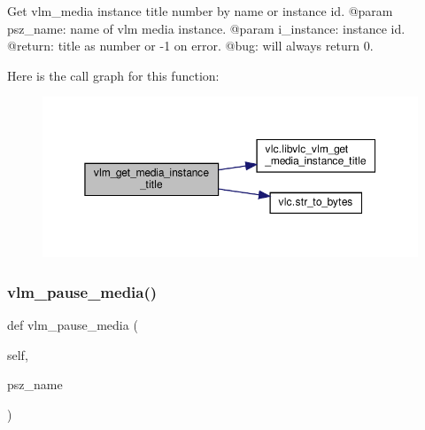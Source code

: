 \begin{DoxyVerb}Get vlm_media instance title number by name or instance id.
@param psz_name: name of vlm media instance.
@param i_instance: instance id.
@return: title as number or -1 on error.
@bug: will always return 0.
\end{DoxyVerb}
 Here is the call graph for this function\+:
\nopagebreak
\begin{figure}[H]
\begin{center}
\leavevmode
\includegraphics[width=350pt]{classvlc_1_1_instance_ada993533f9c1e0ac7b29e902ed26573a_cgraph}
\end{center}
\end{figure}
\mbox{\label{classvlc_1_1_instance_ae29c5cbd8b89178373fae922d03c85a5}} 
\subsubsection{\texorpdfstring{vlm\+\_\+pause\+\_\+media()}{vlm\_pause\_media()}}
{\footnotesize\ttfamily def vlm\+\_\+pause\+\_\+media (\begin{DoxyParamCaption}\item[{}]{self,  }\item[{}]{psz\+\_\+name }\end{DoxyParamCaption})}


